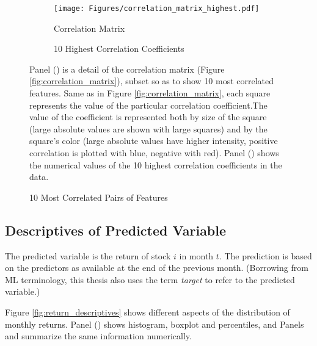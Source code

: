 		\begin{figure}	
			\centering		
			\begin{subfigure}[t]{\textwidth}
				\texttt{[image: Figures/correlation\_matrix\_highest.pdf]}
				\caption{Correlation Matrix}
				\label{fig:correlation_matrix_highest}
			\end{subfigure}
			
			\begin{subfigure}[t]{\textwidth}
				\resizebox{\textwidth}{!}{}
				\caption{10 Highest Correlation Coefficients}
				\label{tab:most_correlated_pairs}
			\end{subfigure}
			\caption{10 Most Correlated Pairs of Features}
			\label{fig:correlation_highest}
			\medskip
			\small
			Panel () is a detail of the correlation matrix (Figure \ref{fig:correlation_matrix}), subset so as to show 10 most correlated features.  Same as in Figure \ref{fig:correlation_matrix}, each square represents the value of the particular correlation coefficient.The value of the coefficient is represented both by size of the square (large absolute values are shown with large squares) and by the square's color (large absolute values have higher intensity, positive correlation is plotted with blue, negative with red). Panel () shows the numerical values of the 10 highest correlation coefficients in the data. 
		\end{figure}
	
		
		
	\subsection{Descriptives of Predicted Variable}
		The predicted variable is the return of stock $i$ in month $t$. The prediction is based on the predictors as available at the end of the previous month. (Borrowing from ML terminology, this thesis also uses the term \textit{target} to refer to the predicted variable.) 
		
		Figure \ref{fig:return_descriptives} shows different aspects of the distribution of monthly returns. Panel () shows histogram, boxplot and percentiles, and Panels 	 and  summarize the same information numerically.  
		
